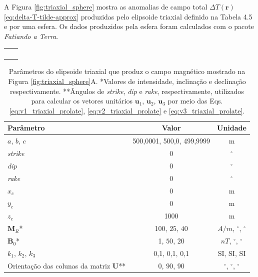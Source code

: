 A Figura \ref{fig:triaxial_sphere} mostra as anomalias de campo total $\Delta T (\mathbf{r})$ \ref{eq:delta-T-tilde-approx} produzidas pelo elipsoide triaxial definido na Tabela 4.5 e por uma esfera. Os dados produzidos pela esfera foram calculados com o pacote \textit{Fatiando a Terra}.

\begin{table}[h!]
	\begin{center}
		\begin{tabular}{lc}
			
			&  \\
			& \\
			& \\
			&  \\

		\end{tabular}
	\end{center}
\end{table}

\begin{table}[h!]
	\begin{center}
		\begin{tabular}{|l|c|c|}
			\hline
			\textbf{Parâmetro}  & \textbf{Valor}  & \textbf{Unidade}\\
			\hline 
			$a$, $b$, $c$   & 500,0001, 500,0, 499,9999   & m\\
			\hline
			\textit{strike}   & $0$ & $^{\circ}$\\
			\hline
			\textit{dip}    & $0$ & $^{\circ}$\\
			\hline
			\textit{rake}   & $0$  & $^{\circ}$\\
			\hline
			$x_c $   & 0  & m\\
			\hline          
			$y_c $   & 0  & m\\
			\hline                
			$z_c $   & 1000  & m\\
			\hline
			$\mathbf{M}_{R}$*  & 100, $25$, $40$  & $A/m$, $^{\circ}$, $^{\circ}$\\
			\hline
			$\mathbf{B}_{0}$*    & 1, $50$, $20$ & $nT$, $^{\circ}$, $^{\circ}$\\
			\hline
			$k_{1}$, $k_{2}$, $k_{3}$   & 0,1, 0,1, 0,1 & SI, SI, SI \\
			\hline
			Orientação das colunas da matriz $\mathbf{U}$**   & $0$, $90$, $90$  & $^{\circ}$, $^{\circ}$, $^{\circ}$\\
			\hline
		\end{tabular}
		\caption{Parâmetros do elipsoide triaxial que produz o campo magnético mostrado na Figura \ref{fig:triaxial_sphere}A. *Valores de intensidade, inclinação e declinação respectivamente. **Ângulos de \textit{strike}, \textit{dip}  e \textit{rake}, respectivamente, utilizados para calcular os vetores unitários $\mathbf{u}_{1}$, $\mathbf{u}_{2}$, $\mathbf{u}_{3}$ por meio das Eqs. \ref{eq:v1_triaxial_prolate}, \ref{eq:v2_triaxial_prolate} e \ref{eq:v3_triaxial_prolate}.}
	\end{center}
	\label{tab:triaxial_sphere}
\end{table}

